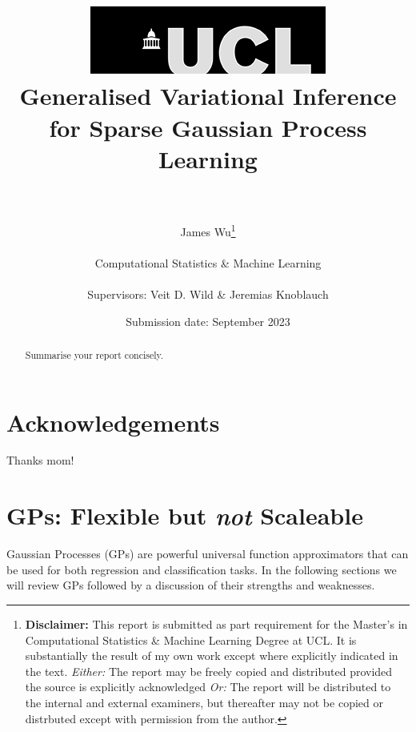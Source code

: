 \documentclass{article}
\title{  	{ \includegraphics[scale=.5]{ucl_logo.png}}\\
{{\Huge Generalised Variational Inference for Sparse Gaussian Process Learning}}\\
{\large }\\
		}
\date{Submission date: September 2023}
\author{James Wu\thanks{
{\bf Disclaimer:}
This report is submitted as part requirement for the Master's in Computational Statistics \& Machine Learning Degree at UCL. It is
substantially the result of my own work except where explicitly indicated in the text.
\newline  %
\emph{Either: }The report may be freely copied and distributed provided the source is explicitly acknowledged
\newline  %
\emph{Or: }The report will be distributed to the internal and external examiners, but thereafter may not be copied or distrbuted except with permission from the author.}
\\ \\
Computational Statistics \& Machine Learning\\ \\
Supervisors: Veit D. Wild \& Jeremias Knoblauch}
\numberwithin{equation}{section}
\begin{document}
\onehalfspacing
\maketitle
{}
\newpage
\setcounter{page}{1}
\section*{Acknowledgements}
Thanks mom!
\newpage

\begin{abstract}
Summarise your report concisely.
\end{abstract}
\newpage
\tableofcontents
\newpage
{}
\setcounter{page}{1}
\section{GPs: Flexible but \textit{not} Scaleable}
Gaussian Processes (GPs) are powerful universal function approximators that can be used for both regression and classification tasks. In the following sections we will review GPs followed by a discussion of their strengths and weaknesses.
\end{document}
